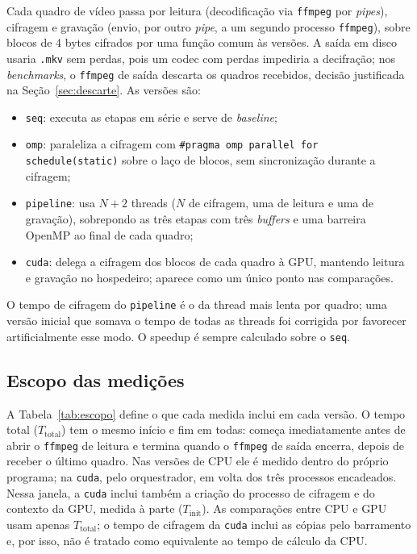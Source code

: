 \documentclass[12pt]{article}
\begin{document}
Cada quadro de vídeo passa por leitura (decodificação via \texttt{ffmpeg} por
\textit{pipes}), cifragem e gravação (envio, por outro \textit{pipe}, a um
segundo processo \texttt{ffmpeg}), sobre blocos de 4 bytes cifrados por uma
função comum às versões. A saída em disco usaria \texttt{.mkv} sem perdas, pois
um codec com perdas impediria a decifração; nos \textit{benchmarks}, o
\texttt{ffmpeg} de saída descarta os quadros recebidos, decisão justificada na
Seção~\ref{sec:descarte}. As versões são:
\begin{itemize}
\item \texttt{seq}: executa as etapas em série e serve de \textit{baseline};
\item \texttt{omp}: paraleliza a cifragem com
\texttt{\#pragma omp parallel for schedule(static)} sobre o laço de blocos, sem
sincronização durante a cifragem;
\item \texttt{pipeline}: usa $N+2$ threads ($N$ de cifragem, uma de leitura e
uma de gravação), sobrepondo as três etapas com três \textit{buffers} e uma
barreira OpenMP ao final de cada quadro;
\item \texttt{cuda}: delega a cifragem dos blocos de cada quadro à GPU, mantendo
leitura e gravação no hospedeiro; aparece como um único ponto nas comparações.
\end{itemize}
O tempo de cifragem do \texttt{pipeline} é o da thread mais lenta por quadro;
uma versão inicial que somava o tempo de todas as threads foi corrigida por
favorecer artificialmente esse modo. O speedup é sempre calculado sobre o
\texttt{seq}.

\subsection{Escopo das medições}
\label{sec:escopo}

A Tabela~\ref{tab:escopo} define o que cada medida inclui em cada versão. O
tempo total ($T_{\mathrm{total}}$) tem o mesmo início e fim em todas: começa
imediatamente antes de abrir o \texttt{ffmpeg} de leitura e termina quando o
\texttt{ffmpeg} de saída encerra, depois de receber o último quadro. Nas
versões de CPU ele é medido dentro do próprio programa; na \texttt{cuda}, pelo
orquestrador, em volta dos três processos encadeados. Nessa janela, a
\texttt{cuda} inclui também a criação do processo de cifragem e do contexto da
GPU, medida à parte ($T_{\mathrm{init}}$). As comparações entre CPU e GPU usam
apenas $T_{\mathrm{total}}$; o tempo de cifragem da \texttt{cuda} inclui as
cópias pelo barramento e, por isso, não é tratado como equivalente ao tempo de
cálculo da CPU.
\end{document}
